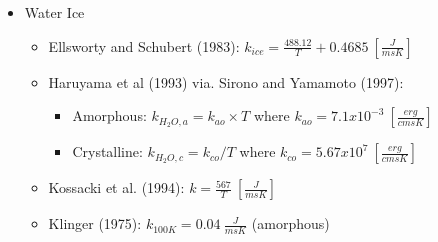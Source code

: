 \documentclass[11pt]{article} %
\begin{document}
	\begin{itemize}
	\item Water Ice
		\begin{itemize}
		\item Ellsworty and Schubert (1983): $k_{ice} = \frac{488.12}{T} +0.4685 \: [\frac{J}{m s K}]$
		\item Haruyama et al (1993) via. Sirono and Yamamoto (1997):
			\begin{itemize}
			\item Amorphous: $k_{H_{2}O, a} = k_{ao} \times T$ where $k_{ao} = 7.1x10^{-3} \: [\frac{erg}{cm s K}]$
			\item Crystalline: $k_{H_{2}O, c} = k_{co}/T$ where $k_{co} = 5.67x10^{7} \: [\frac{erg}{cm s K}]$
			\end{itemize}
		\item Kossacki et al. (1994): $k = \frac{567}{T} \: [\frac{J}{m s K}]$
		\item Klinger (1975): $k_{100 K} = 0.04  \: \frac{J}{m s K}$ (amorphous)
		\end{itemize}
	\end{itemize}
\end{document}
